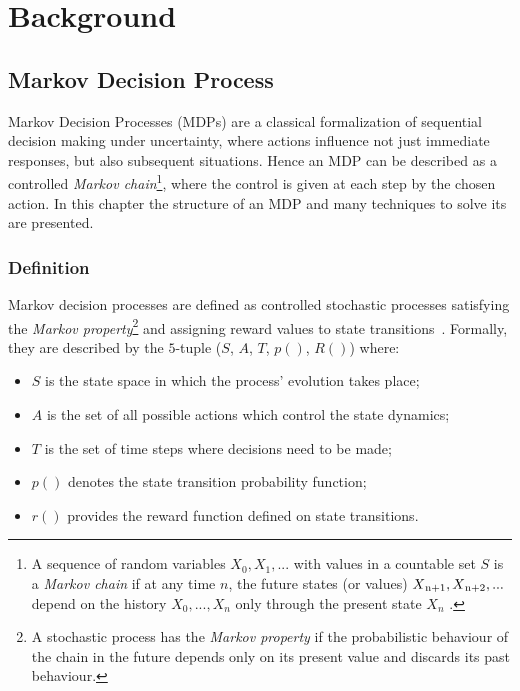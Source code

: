 \chapter{Background}

\section{Markov Decision Process}

Markov Decision Processes (MDPs) are a classical formalization of sequential decision making under uncertainty, where actions influence not just immediate responses, but also subsequent situations. Hence an MDP can be described as a controlled \textit{Markov chain}\footnote{A sequence of random variables $X_0, X_1, . . . $ with values in a countable set $S$ is a \textit{Markov chain} if at any time $n$, the future states (or values) $X\textsubscript{n+1}, X\textsubscript{n+2}, . . .$ depend on the history $X_0, . . . , X_n$ only through the present state $X_n$ \cite{konstantopoulos2009markov}.}, where the control is given at each step by the chosen action. In this chapter the structure of an MDP and many techniques to solve its are presented.

\subsection{Definition} Markov decision processes are defined as controlled stochastic processes satisfying the \textit{Markov property}\footnote{A stochastic process has the \textit{Markov property} if the probabilistic behaviour of the chain in the future depends only on its present value and discards its past behaviour.} and assigning reward values to state transitions~\cite{Put94}.  Formally, they are described by the $5$-tuple ($S$, $A$, $T$, $p()$, $R()$) where:

\begin{itemize}
	\item $S$ is the state space in which the process’ evolution takes place;
	\item $A$ is the set of all possible actions which control the state dynamics;
	\item $T$ is the set of time steps where decisions need to be made;
	\item $p()$ denotes the state transition probability function;
	\item $r()$ provides the reward function defined on state transitions.	
\end{itemize}


